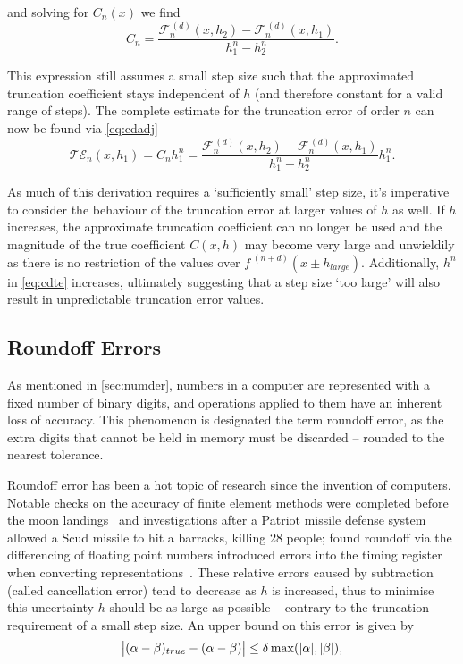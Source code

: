 and solving for $C_n(x)$ we find
\begin{equation}
 C_n = \frac{\mathcal{F}_n^{\,(d)}(x,h_2) - \mathcal{F}_n^{\,(d)}(x,h_1)}{h_1^n - h_2^n}.\label{eq:cdtrcoeff}
\end{equation}

This expression still assumes a small step size such that the approximated truncation coefficient stays independent of $h$ (and therefore constant for a valid range of steps).
The complete estimate for the truncation error of order $n$ can now be found via \cref{eq:cdadj}
\begin{equation}
\mathcal{TE}_n(x,h_1) = C_n h_1^n = \frac{\mathcal{F}_n^{\,(d)}(x,h_2) - \mathcal{F}_n^{\,(d)}(x,h_1)}{h_1^n - h_2^n}h_1^n.\label{eq:cdte}
\end{equation}

As much of this derivation requires a `sufficiently small' step size, it's imperative to consider the behaviour of the truncation error at larger values of $h$ as well.
If $h$ increases, the approximate truncation coefficient can no longer be used and
the magnitude of the true coefficient $C(x,h)$ may become very large and unwieldily as there is no restriction of the values over $f^{\;(n+d)}(x\pm h_{large})$.
Additionally, $h^n$ in \cref{eq:cdte} increases, ultimately suggesting that a step size `too large' will also result in unpredictable truncation error values.

\subsection{Roundoff Errors}\label{subsec:roundoff}

As mentioned in \cref{sec:numder}, numbers in a computer are represented with a fixed number of binary digits, and operations applied to them have an inherent loss of accuracy.
This phenomenon is designated the term roundoff error, as the extra digits that cannot be held in memory must be discarded -- rounded to the nearest tolerance.

Roundoff error has been a hot topic of research since the invention of computers.
Notable checks on the accuracy of finite element methods were completed before the moon landings~\cite{Cyrus1968} and investigations after a Patriot missile defense system allowed a Scud missile to hit a barracks, killing 28 people; found roundoff via the differencing of floating point numbers introduced errors into the timing register when converting representations~\cite{Skeel1992}.
These relative errors caused by subtraction (called cancellation error) tend to decrease as $h$ is increased, thus to minimise this uncertainty $h$ should be as large as possible -- contrary to the truncation requirement of a small step size.
An upper bound on this error is given by
\begin{equation}
 \abs[\big]{(\alpha-\beta)_{true} - (\alpha-\beta)} \leq \delta \max(\abs{\alpha},\abs{\beta}),
\end{equation}


